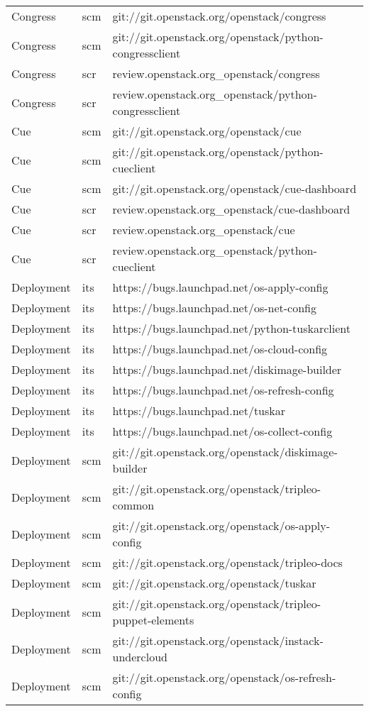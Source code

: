 \begin{center}
\begin{longtable}{|p{4cm}|p{1cm}|p{10cm}|}
Congress&scm&git://git.openstack.org/openstack/congress\\ 
Congress&scm&git://git.openstack.org/openstack/python-congressclient\\ 
Congress&scr&review.openstack.org\_openstack/congress\\ 
Congress&scr&review.openstack.org\_openstack/python-congressclient\\ 
Cue&scm&git://git.openstack.org/openstack/cue\\ 
Cue&scm&git://git.openstack.org/openstack/python-cueclient\\ 
Cue&scm&git://git.openstack.org/openstack/cue-dashboard\\ 
Cue&scr&review.openstack.org\_openstack/cue-dashboard\\ 
Cue&scr&review.openstack.org\_openstack/cue\\ 
Cue&scr&review.openstack.org\_openstack/python-cueclient\\ 
Deployment&its&https://bugs.launchpad.net/os-apply-config\\ 
Deployment&its&https://bugs.launchpad.net/os-net-config\\ 
Deployment&its&https://bugs.launchpad.net/python-tuskarclient\\ 
Deployment&its&https://bugs.launchpad.net/os-cloud-config\\ 
Deployment&its&https://bugs.launchpad.net/diskimage-builder\\ 
Deployment&its&https://bugs.launchpad.net/os-refresh-config\\ 
Deployment&its&https://bugs.launchpad.net/tuskar\\ 
Deployment&its&https://bugs.launchpad.net/os-collect-config\\ 
Deployment&scm&git://git.openstack.org/openstack/diskimage-builder\\ 
Deployment&scm&git://git.openstack.org/openstack/tripleo-common\\ 
Deployment&scm&git://git.openstack.org/openstack/os-apply-config\\ 
Deployment&scm&git://git.openstack.org/openstack/tripleo-docs\\ 
Deployment&scm&git://git.openstack.org/openstack/tuskar\\ 
Deployment&scm&git://git.openstack.org/openstack/tripleo-puppet-elements\\ 
Deployment&scm&git://git.openstack.org/openstack/instack-undercloud\\ 
Deployment&scm&git://git.openstack.org/openstack/os-refresh-config\\ 

\end{longtable}
\end{center}
